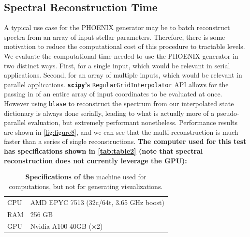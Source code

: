 \documentclass[twocolumn, linenumbers]{aastex631}
\begin{document}
\subsection{Spectral Reconstruction Time}
A typical use case for the PHOENIX generator may be to batch reconstruct spectra from an array of input stellar parameters.
Therefore, there is some motivation to reduce the computational cost of this procedure to tractable levels.
We evaluate the computational time needed to use the PHOENIX generator in two distinct ways.
First, for a single input, which would be relevant in serial applications.
Second, for an array of multiple inputs, which would be relevant in parallel applications.
\textbf{\texttt{scipy}'s} \texttt{RegularGridInterpolator} API allows for the passing in of an entire array of input coordinates to be evaluated at once.
However using \texttt{blase} to reconstruct the spectrum from our interpolated state dictionary is always done serially, leading to what is actually more of a pseudo-parallel evaluation, but extremely performant nonetheless.
Performance results are shown in \autoref{fig:figure8}, and we can see that the multi-reconstruction is much faster than a series of single reconstructions.
\textbf{The computer used for this test has specifications shown in \autoref{tab:table2} (note that spectral reconstruction does not currently leverage the GPU):}
\begin{table}[h!]
    \centering
    \begin{tabular}{ll}
        \hline
        CPU & AMD EPYC 7513 (32c/64t, 3.65 GHz boost)\\
        RAM & 256 GB\\
        GPU & Nvidia A100 40GB ($\times$2)\\
        \hline
    \end{tabular}
    \caption{\textbf{Specifications of the} machine used for computations, but not for generating visualizations.}
    \label{tab:table2}
\end{table}
\end{document}
